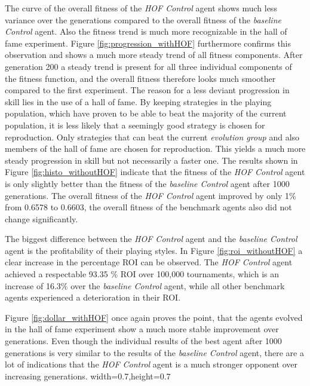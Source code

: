 The curve of the overall fitness of the \textit{HOF Control} agent shows much less variance over the generations compared to the overall fitness of the \textit{baseline Control} agent. Also the fitness trend is much more recognizable in the hall of fame experiment. Figure \ref{fig:progression_withHOF} furthermore confirms this observation and shows a much more steady trend of all fitness components. After generation 200 a steady trend is present for all three individual components of the fitness function, and the overall fitness therefore looks much smoother compared to the first experiment. The reason for a less deviant progression in skill lies in the use of a hall of fame. By keeping strategies in the playing population, which have proven to be able to beat the majority of the current population, it is less likely that a seemingly good strategy is chosen for reproduction. Only strategies that can beat the current \textit{evolution group} and also members of the hall of fame are chosen for reproduction. This yields a much more steady progression in skill but not necessarily a faster one. The results shown in Figure \ref{fig:histo_withoutHOF} indicate that the fitness of the \textit{HOF Control} agent is only slightly better than the fitness of the \textit{baseline Control} agent after 1000 generations. The overall fitness of the \textit{HOF Control} agent improved by only 1\% from 0.6578 to 0.6603, the overall fitness of the benchmark agents also did not change significantly.\par
The biggest difference between the \textit{HOF Control} agent and the \textit{baseline Control} agent is the profitability of their playing styles. In Figure \ref{fig:roi_withoutHOF} a clear increase in the percentage ROI can be observed. The \textit{HOF Control} agent achieved a respectable 93.35 \% ROI over 100,000 tournaments, which is an increase of 16.3\% over the \textit{baseline Control} agent, while all other benchmark agents experienced a deterioration in their ROI.\par 
Figure \ref{fig:dollar_withHOF} once again proves the point, that the agents evolved in the hall of fame experiment show a much more stable improvement over generations. Even though the individual results of the best agent after 1000 generations is very similar to the results of the \textit{baseline Control} agent, there are a lot of indications that the \textit{HOF Control} agent is a much stronger opponent over increasing generations.
  {width=0.7\textwidth,height=0.7\textheight}%
